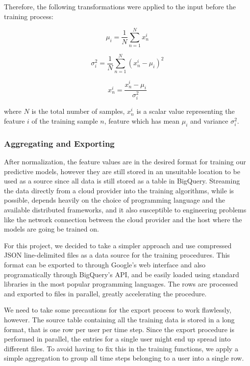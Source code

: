 \documentclass{kththesis}
\begin{document}
Therefore, the following transformations were applied to the input before the training process:

 \begin{equation}
 \mu_i = \frac{1}{N}\sum_{n=1}^{N}x_n^i
 \end{equation}

\begin{equation}
\sigma_i^2 = \frac{1}{N}\sum_{n=1}^{N}(x_n^i - \mu_i)^2
\end{equation}
 
\begin{equation}
x_n^i = \frac{x_n^i - \mu_i}{\sigma_i^2}
\end{equation}

where $N$ is the total number of samples, $x_n^i$ is a scalar value representing the feature $i$ of the training sample $n$, feature which has mean $\mu_i$ and variance $\sigma^2_i$.

\subsubsection{Aggregating and Exporting}

After normalization, the feature values are in the desired format for training our predictive models, however they are still stored in an unsuitable location to be used as a source since all data is still stored as a table in BigQuery. Streaming the data directly from a cloud provider into the training algorithms, while is possible, depends heavily on the choice of programming language and the available distributed frameworks, and it also susceptible to engineering problems like the network connection between the cloud provider and the host where the models are going be trained on.

For this project, we decided to take a simpler approach and use compressed JSON line-delimited files as a data source for the training procedures. This format can be exported to through Google's web interface and also programatically through BigQuery's API, and be easily loaded using standard libraries in the most popular programming languages. The rows are processed and exported to files in parallel, greatly accelerating the procedure.

We need to take some precautions for the export process to work flawlessly, however. The source table containing all the training data is stored in a long format, that is one row per user per time step. Since the export procedure is performed in parallel, the entries for a single user might end up spread into different files. To avoid having to fix this in the training functions, we apply a simple aggregation to group all time steps belonging to a user into a single row.
\end{document}

